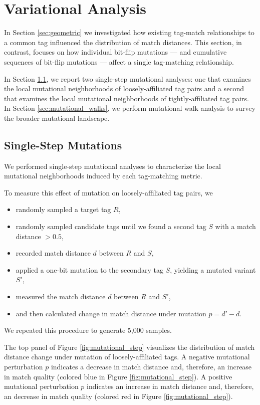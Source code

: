 \section{Variational Analysis} \label{sec:variational}

In Section \ref{sec:geometric} we investigated how existing tag-match relationships to a common tag influenced the distribution of match distances.
This section, in contrast, focuses on how individual bit-flip mutations --- and cumulative sequences of bit-flip mutations --- affect a single tag-matching relationship.

In Section \ref{sec:single_step}, we report two single-step mutational analyses: one that examines the local mutational neighborhoods of loosely-affiliated tag pairs and a second that examines the local mutational neighborhoods of tightly-affiliated tag pairs.
In Section \ref{sec:mutational_walks}, we perform mutational walk analysis to survey the broader mutational landscape.

\subsection{Single-Step Mutations} \label{sec:single_step}



We performed single-step mutational analyses to characterize the local mutational neighborhoods induced by each tag-matching metric.

To measure this effect of mutation on loosely-affiliated tag pairs, we
\begin{itemize}
    \item randomly sampled a target tag $R$,
    \item randomly sampled candidate tags until we found a second tag $S$ with a match distance $> 0.5$,
    \item recorded match distance $d$ between $R$ and $S$,
    \item applied a one-bit mutation to the secondary tag $S$, yielding a mutated variant $S'$, 
    \item measured the match distance $d$ between $R$ and $S'$,
    \item and then calculated change in match distance under mutation $p = d' - d$.
\end{itemize}
We repeated this procedure to generate 5,000 samples.

The top panel of Figure \ref{fig:mutational_step} visualizes the distribution of match distance change under mutation of loosely-affiliated tags.
A negative mutational perturbation $p$ indicates a decrease in match distance and, therefore, an increase in match quality (colored blue in Figure \ref{fig:mutational_step}).
A positive mutational perturbation $p$ indicates an increase in match distance and, therefore, an decrease in match quality (colored red in Figure \ref{fig:mutational_step}).

